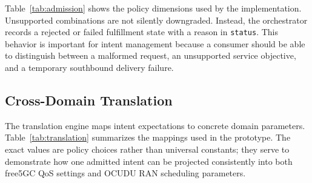 \begin{table}[t]
  \caption{Admission policy used in the prototype}
  \label{tab:admission}
\end{table}

Table~\ref{tab:admission} shows the policy dimensions used by the implementation. Unsupported combinations are not silently downgraded. Instead, the orchestrator records a rejected or failed fulfillment state with a reason in \texttt{status}. This behavior is important for intent management because a consumer should be able to distinguish between a malformed request, an unsupported service objective, and a temporary southbound delivery failure.

\subsection{Cross-Domain Translation}
\label{subsec:translation}

The translation engine maps intent expectations to concrete domain parameters. Table~\ref{tab:translation} summarizes the mappings used in the prototype. The exact values are policy choices rather than universal constants; they serve to demonstrate how one admitted intent can be projected consistently into both free5GC QoS settings and OCUDU RAN scheduling parameters.

